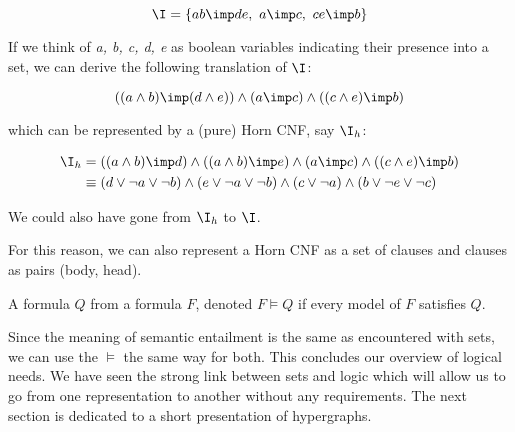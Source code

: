 \[ \I = \{ ab \imp de, \ a \imp c, \ ce \imp b  \} \]

\noindent If we think of \textit{a, b, c, d, e} as boolean variables indicating
their presence into a set, we can derive the following translation of $\I$:

	\[ ((a \land b) \imp (d \land e)) \land (a \imp c) \land
		 ((c \land e) \imp b) \]

\noindent which can be represented by a (pure) Horn CNF, say $\I_h$:

\begin{align*}
	\I_h & = ((a \land b) \imp d) \land ((a \land b) \imp e) \land (a \imp c) 
	\land ((c \land e) \imp b) \\
	& \equiv (d \lor \lnot a \lor \lnot b) \land (e \lor \lnot a \lor \lnot b) 
	\land 
	(c \lor \lnot a) \land (b \lor \lnot e \lor \lnot c) 
\end{align*}

\noindent We could also have gone from $\I_h$ to $\I$.

\vspace{1.2em}

For this reason, we can also represent a Horn CNF as a set of clauses and 
clauses as pairs (body, head).

\begin{definition} A formula $Q$ 
 from a formula $F$, denoted $F \models Q$ if 
every model of $F$ satisfies $Q$.
	
\end{definition}

Since the meaning of semantic entailment is the same as encountered with sets,
we can use the $\models$ the same way for both. This concludes our overview of
logical needs. We have seen the strong link between sets and logic which will 
allow us to go from one representation to another without any requirements. The
next section is dedicated to a short presentation of hypergraphs.



















